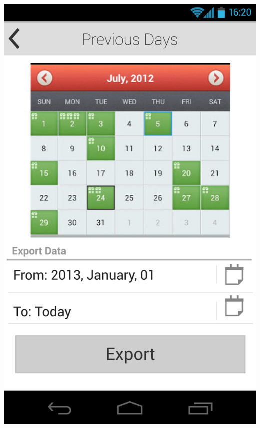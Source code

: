 \documentclass[pdftex,12pt,a4paper]{report}
\begin{document}
\begin{center}
	\includegraphics[scale=0.18]{Screens/02-Previous--No-Selection.png}
	

\end{center}
\end{document}
